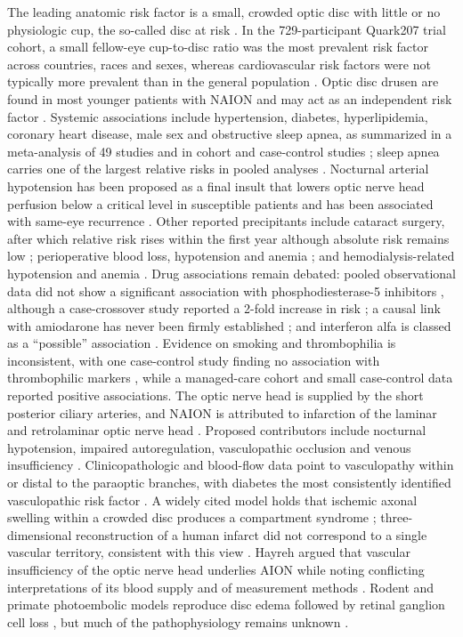 \documentclass[journal]{IEEEtran}
\begin{document}
The leading anatomic risk factor is a small, crowded optic disc with
little or no physiologic cup, the so-called disc at risk
\cite{p6514298, p3684223}. In the 729-participant Quark207 trial
cohort, a small fellow-eye cup-to-disc ratio was the most prevalent risk
factor across countries, races and sexes, whereas cardiovascular risk
factors were not typically more prevalent than in the general population
\cite{p38211825}. Optic disc drusen are found in most younger patients
with NAION and may act as an independent risk factor
\cite{p32298654, p31972711}. Systemic associations include
hypertension, diabetes, hyperlipidemia, coronary heart disease, male sex
and obstructive sleep apnea, as summarized in a meta-analysis of 49
studies \cite{p34671609} and in cohort and case-control studies
\cite{p7977604, p9366670, p27659545}; sleep apnea carries one of the
largest relative risks in pooled analyses \cite{p26443989, p34671609}.
Nocturnal arterial hypotension has been proposed as a final insult that
lowers optic nerve head perfusion below a critical level in susceptible
patients \cite{p8172267} and has been associated with same-eye
recurrence \cite{p11704035}. Other reported precipitants include
cataract surgery, after which relative risk rises within the first year
although absolute risk remains low \cite{p36166807, p32818451};
perioperative blood loss, hypotension and anemia \cite{p18358851}; and
hemodialysis-related hypotension and anemia \cite{p11730278}. Drug
associations remain debated: pooled observational data did not show a
significant association with phosphodiesterase-5 inhibitors
\cite{p31559705}, although a case-crossover study reported a 2-fold
increase in risk \cite{p26720519}; a causal link with amiodarone has
never been firmly established \cite{p16148635}; and interferon alfa is
classed as a ``possible'' association \cite{p20630599}. Evidence on
smoking \cite{p17398323} and thrombophilia is inconsistent, with one
case-control study finding no association with thrombophilic markers
\cite{p10201595}, while a managed-care cohort \cite{p27659545} and
small case-control data \cite{p15834600} reported positive
associations. The optic nerve head is supplied by the short posterior
ciliary arteries, and NAION is attributed to infarction of the laminar
and retrolaminar optic nerve head \cite{p19596112}. Proposed
contributors include nocturnal hypotension, impaired autoregulation,
vasculopathic occlusion and venous insufficiency \cite{p19596112}.
Clinicopathologic and blood-flow data point to vasculopathy within or
distal to the paraoptic branches, with diabetes the most consistently
identified vasculopathic risk factor \cite{p12782932}. A widely cited
model holds that ischemic axonal swelling within a crowded disc produces
a compartment syndrome \cite{p19596112}; three-dimensional
reconstruction of a human infarct did not correspond to a single
vascular territory, consistent with this view \cite{p14522783}. Hayreh
argued that vascular insufficiency of the optic nerve head underlies
AION while noting conflicting interpretations of its blood supply and of
measurement methods \cite{p11470451}. Rodent and primate photoembolic
models reproduce disc edema followed by retinal ganglion cell loss
\cite{p14507856, p18326695}, but much of the pathophysiology remains
unknown \cite{p26959135}.
\end{document}
